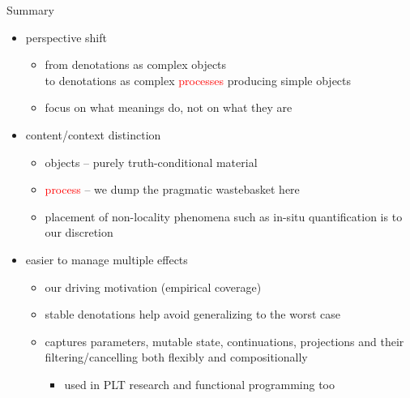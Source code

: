 \documentclass{beamer}
\begin{document}
\begin{frame}{Summary}
  \begin{itemize}
  \item perspective shift
    \begin{itemize}
    \item from denotations as complex objects \\
          to denotations as complex \textcolor{red}{processes} producing simple \textcolor{mygreen}{objects}
    \item focus on what meanings do, not on what they are
    \end{itemize}
    \vfill
    \pause
  \item content/context distinction
    \begin{itemize}
    \item \textcolor{mygreen}{objects} -- purely truth-conditional material
    \item \textcolor{red}{process} -- we dump the pragmatic wastebasket here
    \item placement of non-locality phenomena such as in-situ
      quantification is to our discretion
    \end{itemize}
    \vfill
    \pause
  \item easier to manage multiple effects
    \begin{itemize}
    \item our driving motivation (empirical coverage)
    \item stable denotations help avoid generalizing to the worst case
    \item captures parameters, mutable state, continuations, projections
      and their filtering/cancelling both flexibly and compositionally
      \begin{itemize}
      \item used in PLT research and functional programming too
      \end{itemize}
    \end{itemize}
  \end{itemize}
\end{frame}
\end{document}
